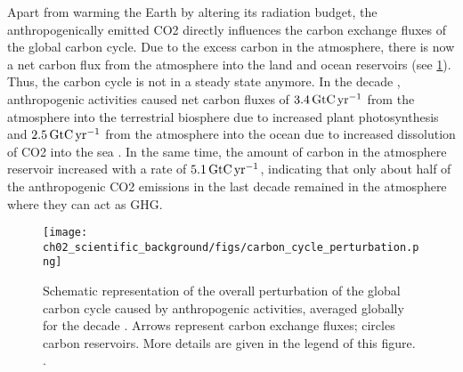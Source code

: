 Apart from warming the Earth by altering its radiation budget, the
anthropogenically emitted \ac{CO2} directly influences the carbon exchange
fluxes of the global carbon cycle. Due to the excess carbon in the atmosphere,
there is now a net carbon flux from the atmosphere into the land and ocean
reservoirs (see \cref{fig:02:carbon_cycle_perturbation}). Thus, the carbon
cycle is not in a steady state anymore. In the decade ,
anthropogenic activities caused net carbon fluxes of $3.4 \unit{\GtCyr{}}$ from
the atmosphere into the terrestrial biosphere due to increased plant
photosynthesis and $2.5 \unit{\GtCyr{}}$ from the atmosphere into the ocean due
to increased dissolution of \ac{CO2} into the sea
\autocite{Friedlingstein2020}. In the same time, the amount of carbon in the
atmosphere reservoir increased with a rate of $5.1 \unit{\GtCyr{}}$, indicating
that only about half of the anthropogenic \ac{CO2} emissions in the last decade
remained in the atmosphere \autocite{Friedlingstein2020} where they can act as
\ac{GHG}.

\begin{figure}[t]
  \centering
  \texttt{[image: 
    ch02\_scientific\_background/figs/carbon\_cycle\_perturbation.png]}
  \caption[
    Schematic representation of the overall perturbation of the global carbon
    cycle caused by anthropogenic activities.
  ]{
    Schematic representation of the overall perturbation of the global carbon
    cycle caused by anthropogenic activities, averaged globally for the decade
    . Arrows represent carbon exchange fluxes; circles carbon
    reservoirs. More details are given in the legend of this figure.
    .
  }
  \label{fig:02:carbon_cycle_perturbation}
\end{figure}

